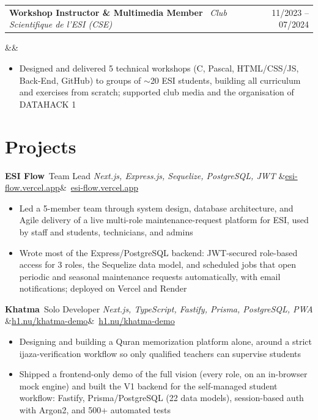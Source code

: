 \documentclass[10pt, a4paper]{article}
\makeatletter
\newcommand{\cventry}[4]{%
  \noindent
  \begin{tabular*}{\linewidth}{@{}l@{\extracolsep{\fill}}r@{}}
    \textbf{#1} \textbullet\ \textit{#2} & \textcolor{textsecondary}{\small #3}
  \end{tabular*}%
  \ifx&#4&\else\\\textcolor{textsecondary}{\small #4}\fi%
  \vspace{1pt}%
}
\newcommand{\cvproject}[4]{%
  \noindent
  \textbf{#1}\ \textcolor{textsecondary}{\small #2}%
  \hfill\textcolor{textsecondary}{\small\textit{#3}}%
  \ifx&#4&\else\ \textcolor{accent}{\small #4}\fi\\[2pt]%
}
\makeatother
\begin{document}
\vspace{3pt}

\cventry{Workshop Instructor \& Multimedia Member}{Club Scientifique de l'ESI (CSE)}{11/2023 -- 07/2024}{}
\begin{itemize}
  \item Designed and delivered 5 technical workshops (C, Pascal, HTML/CSS/JS, Back-End, GitHub) to groups of $\sim$20 ESI students, building all curriculum and exercises from scratch; supported club media and the organisation of DATAHACK 1
\end{itemize}

\section{Projects}

\cvproject{ESI Flow}{Team Lead}{Next.js, Express.js, Sequelize, PostgreSQL, JWT}{\href{https://esi-flow.vercel.app}{esi-flow.vercel.app}}
\begin{itemize}
  \item Led a 5-member team through system design, database architecture, and Agile delivery of a live multi-role maintenance-request platform for ESI, used by staff and students, technicians, and admins
  \item Wrote most of the Express/PostgreSQL backend: JWT-secured role-based access for 3 roles, the Sequelize data model, and scheduled jobs that open periodic and seasonal maintenance requests automatically, with email notifications; deployed on Vercel and Render
\end{itemize}

\vspace{4pt}

\cvproject{Khatma}{Solo Developer}{Next.js, TypeScript, Fastify, Prisma, PostgreSQL, PWA}{\href{https://h1.nu/khatma-demo}{h1.nu/khatma-demo}}
\begin{itemize}
  \item Designing and building a Quran memorization platform alone, around a strict ijaza-verification workflow so only qualified teachers can supervise students
  \item Shipped a frontend-only demo of the full vision (every role, on an in-browser mock engine) and built the V1 backend for the self-managed student workflow: Fastify, Prisma/PostgreSQL (22 data models), session-based auth with Argon2, and 500+ automated tests
\end{itemize}
\end{document}
